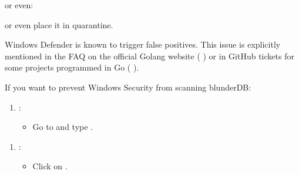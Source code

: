 \documentclass[letterpaper,10pt,english]{sphinxmanual}
\begin{document}
\begin{figure}[htbp]
\centering

\noindent{}
\end{figure}

\sphinxAtStartPar
or even:

\begin{figure}[htbp]
\centering

\noindent{}
\end{figure}

\sphinxAtStartPar
or even place it in quarantine.

\sphinxAtStartPar
Windows Defender is known to trigger false positives. This issue is explicitly mentioned in the FAQ on the official Golang website (  ) or in GitHub tickets for some projects programmed in Go (  ).

\sphinxAtStartPar
If you want to prevent Windows Security from scanning blunderDB:
\begin{enumerate}
%
\item {} 
\sphinxAtStartPar
{}:
\begin{itemize}
\item {} 
\sphinxAtStartPar
Go to  and type .

\end{itemize}

\end{enumerate}

\begin{figure}[htbp]
\centering

\noindent{}
\end{figure}
\begin{enumerate}
%
\setcounter{enumi}{1}
\item {} 
\sphinxAtStartPar
{}:
\begin{itemize}
\item {} 
\sphinxAtStartPar
Click on .

\end{itemize}

\end{enumerate}
\end{document}
